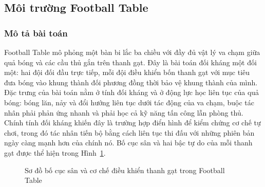 \subsection{Môi trường Football Table}
\label{sub:env-football}

\subsubsection{Mô tả bài toán}
\indent Football Table mô phỏng một bàn bi lắc ba chiều với đầy đủ vật lý va chạm giữa
quả bóng và các cầu thủ gắn trên thanh gạt. Đây là bài toán đối kháng một đối một:
hai đội đối đầu trực tiếp, mỗi đội điều khiển bốn thanh gạt với mục tiêu đưa bóng vào
khung thành đối phương đồng thời bảo vệ khung thành của mình. Đặc trưng của bài toán
nằm ở tính đối kháng và ở động lực học liên tục của quả bóng: bóng lăn, nảy và đổi
hướng liên tục dưới tác động của va chạm, buộc tác nhân phải phản ứng nhanh và phải
học cả kỹ năng tấn công lẫn phòng thủ. Chính tính đối kháng khiến đây là trường hợp
điển hình để kiểm chứng cơ chế tự chơi, trong đó tác nhân tiến bộ bằng cách liên tục
thi đấu với những phiên bản ngày càng mạnh hơn của chính nó. Bố cục sân và hai bậc tự
do của mỗi thanh gạt được thể hiện trong Hình~\ref{fig:football_layout}.

\begin{figure}[H]
\centering
{}
\caption{Sơ đồ bố cục sân và cơ chế điều khiển thanh gạt trong Football Table}
\label{fig:football_layout}
\end{figure}

